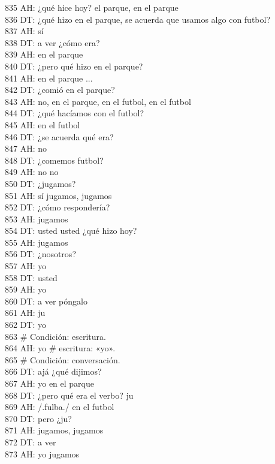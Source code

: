 835 AH: ¿qué hice hoy? el parque, en el parque\\
836 DT: ¿qué hizo en el parque, se acuerda que usamos algo con futbol?\\
837 AH: sí\\
838 DT: a ver ¿cómo era?\\
839 AH: en el parque\\
840 DT: ¿pero qué hizo en el parque?\\
841 AH: en el parque ...\\
842 DT: ¿comió en el parque?\\
843 AH: no, en el parque, en el futbol, en el futbol\\
844 DT: ¿qué hacíamos con el futbol?\\
845 AH: en el futbol\\
846 DT: ¿se acuerda qué era?\\
847 AH: no\\
848 DT: ¿comemos futbol?\\
849 AH: no no\\
850 DT: ¿jugamos?\\
851 AH: sí jugamos, jugamos\\
852 DT: ¿cómo respondería?\\
853 AH: jugamos\\
854 DT: usted usted ¿qué hizo hoy?\\
855 AH: jugamos\\
856 DT: ¿nosotros?\\
857 AH: yo\\
858 DT: usted\\
859 AH: yo\\
860 DT: a ver póngalo\\
861 AH: ju\\
862 DT: yo\\
863 \# Condición: escritura.\\
864 AH: yo \# escritura: «yo».\\
865 \# Condición: conversación.\\
866 DT: ajá ¿qué dijimos?\\
867 AH: yo en el parque\\
868 DT: ¿pero qué era el verbo? ju\\
869 AH: /.fulba./ en el futbol\\
870 DT: pero ¿ju?\\
871 AH: jugamos, jugamos\\
872 DT: a ver\\
873 AH: yo jugamos\\
